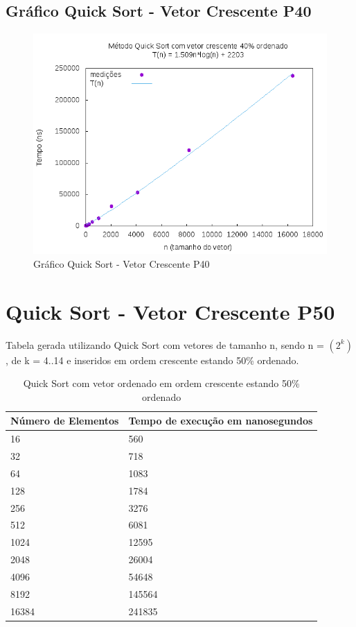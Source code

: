 \documentclass[12pt,a4paper,twoside]{report}
\begin{document}
\subsection{Gráfico Quick Sort - Vetor Crescente P40}
\begin{figure}[H]
    \centering
    \includegraphics[width=0.7\linewidth]{graficos/QuickSort/vIntCrescenteP40/vIntCrescenteP40.png}
  \caption{Gráfico Quick Sort - Vetor Crescente P40}
\end{figure}

\section{Quick Sort - Vetor Crescente P50}
Tabela gerada utilizando Quick Sort com vetores de tamanho n, sendo n = $(2^k)$, de k = 4..14 e inseridos em ordem crescente estando 50\% ordenado.
\begin{table}[H]
\centering
\caption{Quick Sort com vetor ordenado em ordem crescente estando 50\% ordenado}
\label{my-label}
\begin{tabular}{|l|l|}
\hline
\multicolumn{1}{|c|}{\textbf{Número de Elementos}} & \multicolumn{1}{c|}{\textbf{Tempo de execução em nanosegundos}} \\ \hline
16 & 560 \\ \hline
32 & 718 \\ \hline
64 & 1083 \\ \hline
128 & 1784 \\ \hline
256 & 3276 \\ \hline
512 & 6081 \\ \hline
1024 & 12595 \\ \hline
2048 & 26004 \\ \hline
4096 & 54648 \\ \hline
8192 & 145564 \\ \hline
16384 & 241835 \\ \hline
\end{tabular}
\end{table}
\end{document}
